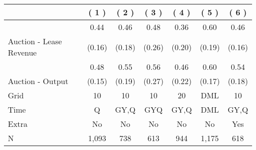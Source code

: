 
\begin{tabular}{lcccccc}
\toprule
  & ( 1 ) & ( 2 ) & ( 3 ) & ( 4 ) & ( 5 ) & ( 6 )\\
\midrule
 & 0.44 & 0.46 & 0.48 & 0.36 & 0.60 & 0.46\\

\multirow{-2}{*}{\raggedright\arraybackslash Auction - Lease Revenue} & (0.16) & (0.18) & (0.26) & (0.20) & (0.19) & (0.16)\\

\midrule
 & 0.48 & 0.55 & 0.56 & 0.46 & 0.60 & 0.54\\

\multirow{-2}{*}{\raggedright\arraybackslash Auction - Output} & (0.15) & (0.19) & (0.27) & (0.22) & (0.17) & (0.18)\\

\midrule
Grid & 10 & 10 & 10 & 20 & DML & 10\\

Time & Q & GY,Q & GYQ & GY,Q & DML & GY,Q\\

Extra & No & No & No & No & No & Yes\\

N & 1,093 & 738 & 613 & 944 & 1,175 & 618\\
\bottomrule
\end{tabular}
